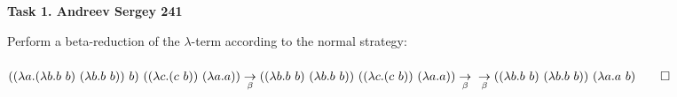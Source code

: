 \documentclass[12pt]{article}
\begin{document}
 
\begin{center} 
\textbf{Task 1. Andreev Sergey 241}\\ 
\end{center} 
Perform a beta-reduction of the $\lambda$-term according to the normal strategy:\\ 
\\ 
$((\lambda a.(\lambda b.b \ b)\ (\lambda b.b \ b))\ b)\ ((\lambda c.(c \ b)) \ (\lambda a.a)) \underset{\beta}{\to} 
((\lambda b.b \ b)\ (\lambda b.b \ b)) \ ((\lambda c.(c \ b)) \ (\lambda a.a)) \underset{\beta}{\to}\\ 
\underset{\beta}{\to}((\lambda b.b \ b)\ (\lambda b.b \ b)) \ (\lambda a.a \ b) \qed$ 
\end{document}
